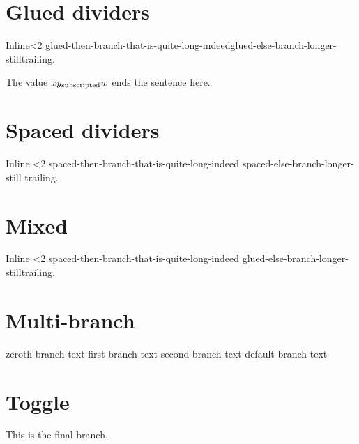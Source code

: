 \documentclass[11pt]{article}
\newif\ifdrafting
\begin{document}
\section{Glued dividers}

Inline<2 glued-then-branch-that-is-quite-long-indeed\else glued-else-branch-longer-still\fi trailing.

The value $x\ifmmode y_{\text{subscripted}}\else z_{\text{alternate}}\fi w$ ends the sentence here.

\section{Spaced dividers}

Inline <2 spaced-then-branch-that-is-quite-long-indeed \else spaced-else-branch-longer-still \fi trailing.

\section{Mixed}

Inline <2 spaced-then-branch-that-is-quite-long-indeed \else glued-else-branch-longer-still\fi trailing.

\section{Multi-branch}

\ifcase\value{page}\relax zeroth-branch-text \or first-branch-text \or second-branch-text \else default-branch-text \fi

\section{Toggle}

\ifdrafting This is the drafting branch, which runs long enough to overflow the line. \else This is the final branch. \fi
\end{document}
